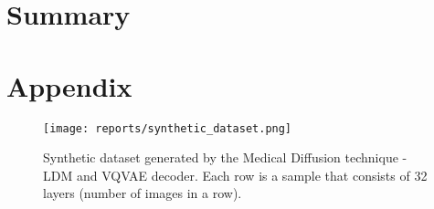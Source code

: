 


\newpage
\section{Summary}


% 
\newpage
\setlength\intextsep{0.3cm}

\printbibliography[heading=bibintoc,title=Bibliography]

\newpage
\section{Appendix}

\begin{figure}
    \centering
    \texttt{[image: reports/synthetic\_dataset.png]}
    \caption{Synthetic dataset generated by the Medical Diffusion technique - LDM and VQVAE decoder. Each row is a sample that consists of 32 layers (number of images in a row).}
    \label{fig:synthetic-dataset}
\end{figure}

